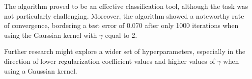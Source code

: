 \documentclass[runningheads]{llncs}
\begin{document}
The algorithm proved to be an effective classification tool, although the task was not particularly challenging. Moreover, the algorithm showed a noteworthy rate of convergence, bordering a test error of 0.070 after only 1000 iterations when using the Gaussian kernel with $\gamma$ equal to 2.

Further research might explore a wider set of hyperparameters, especially in the direction of lower regularization coefficient values and higher values of $\gamma$ when using a Gaussian kernel.



\end{document}
